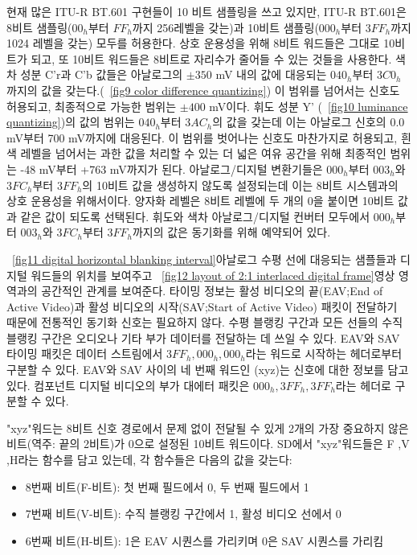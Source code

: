 현재 많은 ITU-R BT.601 구현들이 10 비트 샘플링을 쓰고 있지만, ITU-R BT.601은 8비트 샘플링($00_h$부터 $FF_h$까지 256레벨을 갖는)과 10비트 샘플링($000_h$부터 $3FF_h$까지 1024 레벨을 갖는) 모두를 허용한다.
상호 운용성을 위해 8비트 워드들은 그대로 10비트가 되고, 또 10비트 워드들은 8비트로 자리수가 줄어들 수 있는 것들을 사용한다. 색차 성분 C'r과 C'b 값들은 아날로그의 $\pm 350$ mV 내의 값에 대응되는 $040_h$부터 $3C0_h$까지의 값을 갖는다.(\figurename~\ref{fig9 color difference quantizing})
이 범위를 넘어서는 신호도 허용되고, 최종적으로 가능한 범위는 $\pm 400$ mV이다. 휘도 성분 Y' (\figurename~\ref{fig10 luminance quantizing})의 값의 범위는 $040_h$부터 $3AC_h$의 값을 갖는데 이는 아날로그 신호의 0.0 mV부터 700 mV까지에 대응된다.
이 범위를 벗어나는 신호도 마찬가지로 허용되고, 흰색 레벨을 넘어서는 과한 값을 처리할 수 있는 더 넓은 여유 공간을 위해 최종적인 범위는 -48 mV부터 +763 mV까지가 된다.
아날로그/디지털 변환기들은 $000_h$부터 $003_h$와 $3FC_h$부터 $3FF_h$의 10비트 값을 생성하지 않도록 설정되는데 이는 8비트 시스템과의 상호 운용성을 위해서이다.
양자화 레벨은 8비트 레벨에 두 개의 0을 붙이면 10비트 값과 같은 값이 되도록 선택된다. 휘도와 색차 아날로그/디지털 컨버터 모두에서 $000_h$부터 $003_h$와 $3FC_h$부터 $3FF_h$까지의 값은 동기화를 위해 예약되어 있다.

\figurename~\ref{fig11 digital horizontal blanking interval}\은 아날로그 수평 선에 대응되는 샘플들과 디지털 워드들의 위치를 보여주고 \figurename~\ref{fig12 layout of 2:1 interlaced digital frame}\은 영상 영역과의 공간적인 관계를 보여준다.
타이밍 정보는 활성 비디오의 끝(EAV;End of Active Video)과 활성 비디오의 시작(SAV;Start of Active Video) 패킷이 전달하기 때문에 전통적인 동기화 신호는 필요하지 않다.
수평 블랭킹 구간과 모든 선들의 수직 블랭킹 구간은 오디오나 기타 부가 데이터를 전달하는 데 쓰일 수 있다. EAV와 SAV 타이밍 패킷은 데이터 스트림에서 $3FF_h, 000_h, 000_h$라는 워드로 시작하는 헤더로부터 구분할 수 있다.
EAV와 SAV 사이의 네 번째 워드인 (xyz)는 신호에 대한 정보를 담고 있다. 컴포넌트 디지털 비디오의 부가 대에터 패킷은 $000_h, 3FF_h, 3FF_h$라는 헤더로 구분할 수 있다.

"xyz"워드는 8비트 신호 경로에서 문제 없이 전달될 수 있게 2개의 가장 중요하지 않은 비트(역주: 끝의 2비트)가 0으로 설정된 10비트 워드이다.
SD에서 "xyz"워드들은 F ,V ,H라는 함수를 담고 있는데, 각 함수들은 다음의 값을 갖는다:
\begin{itemize}
    \item 8번째 비트(F-비트): 첫 번째 필드에서 0, 두 번째 필드에서 1
    \item 7번째 비트(V-비트): 수직 블랭킹 구간에서 1, 활성 비디오 선에서 0
    \item 6번째 비트(H-비트): 1은 EAV 시퀀스를 가리키며 0은 SAV 시퀀스를 가리킴
\end{itemize}

